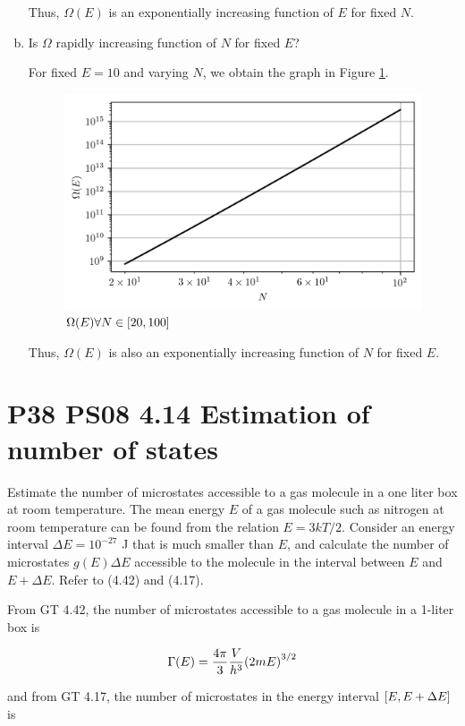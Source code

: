 \documentclass[9pt,a4paper,twocolumn]{article}
\begin{document}
\begin{enumerate}[(a)]
Thus, $\Omega(E)$ is an exponentially increasing function of $E$ for fixed $N$.

\item Is $\Omega$ rapidly increasing function of $N$ for fixed $E$?

For fixed $E = 10$ and varying $N$, we obtain the graph in Figure \ref{fig:fixed-N}.

\begin{figure}[h!]
	\centering
	\includegraphics[width=0.75\linewidth]{fixedN.png}
	\caption{$\Omega(E) \forall N \in \qty[20, 100]$}
	\label{fig:fixed-N}
\end{figure}

Thus, $\Omega(E)$ is also an exponentially increasing function of $N$ for fixed $E$.

\end{enumerate}

\section{P38 PS08 4.14 Estimation of number of states}
Estimate the number of microstates accessible to a gas molecule in a one liter box at room temperature. The mean energy $E$ of a gas molecule such as nitrogen at room temperature can be found from the relation $E = 3kT/2$. Consider an energy interval $\Delta E = 10^{-27}$ J that is much smaller than $E$, and calculate the number of microstates $g(E)\Delta E$ accessible to the molecule in the interval between $E$ and $E + \Delta E$. Refer to (4.42) and (4.17).

From GT 4.42, the number of microstates accessible to a gas molecule in a 1-liter box is

\begin{equation}
	\Gamma(E) = \frac{4\pi}{3}\frac{V}{h^3}\qty(2mE)^{3/2} \label{eq:given-states}
\end{equation}

and from GT 4.17, the number of microstates in the energy interval $\qty[E, E+\Delta E]$ is
\end{document}
